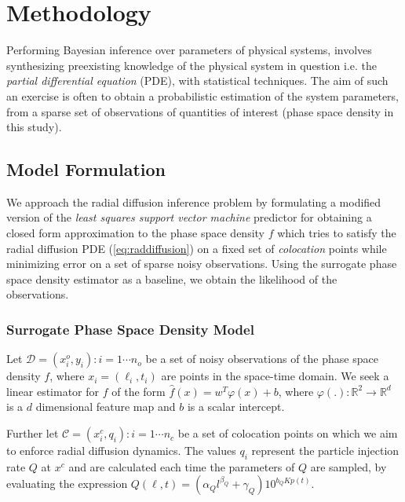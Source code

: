 \section{Methodology}

Performing Bayesian inference over parameters of physical systems, involves synthesizing 
preexisting knowledge of the physical system in question i.e. the 
\emph{partial differential equation} (PDE), with statistical techniques. The aim of such an 
exercise is often to obtain a probabilistic estimation of the system parameters, from a 
sparse set of observations of quantities of interest (phase space density in this study). 


\subsection{Model Formulation}

We approach the radial diffusion inference problem by formulating a modified version of the 
\emph{least squares support vector machine} predictor for obtaining a closed form approximation to 
the phase space density $f$ which tries to satisfy the radial diffusion PDE 
(\cref{eq:raddiffusion}) on a fixed set of \emph{colocation} points while minimizing error on a set 
of sparse noisy observations. Using the surrogate phase space density estimator as a baseline, we 
obtain the likelihood of the observations.


\subsubsection*{Surrogate Phase Space Density Model}

Let $\mathcal{D}={(x^{o}_{i}, y_{i}): i = 1 \cdots n_{o}}$ be a set of noisy observations of the 
phase space density $f$, where $x_{i} = (\ell_{i}, t_{i})$ are points in the space-time domain. We 
seek a linear estimator for $f$ of the form $\hat{f}(x) = w^{T}\varphi(x) + b$, where 
$\varphi(.): \mathbb{R}^{2} \rightarrow \mathbb{R}^{d}$ is a $d$ dimensional feature map and $b$ is 
a scalar intercept.

Further let $\mathcal{C} ={(x^{c}_{i}, q_{i}): i = 1 \cdots n_{c}}$ be a set of colocation points 
on which we aim to enforce radial diffusion dynamics. The values $q_{i}$ represent the particle 
injection rate $Q$ at $x^c$ and are calculated each time the parameters of $Q$ are sampled, by 
evaluating the expression $Q(\ell,t) = (\alpha_{Q}l^{\beta_{Q}} + \gamma_{Q})10^{b_{Q}Kp(t)}$.

